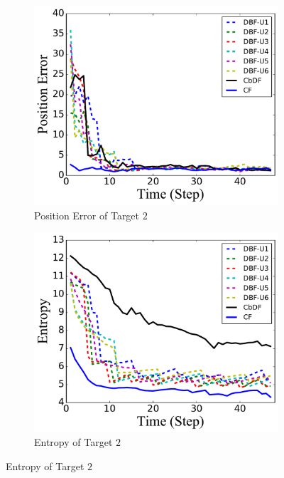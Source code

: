 \begin{figure}
\begin{subfigure}[b]{0.23\textwidth}
		\end{subfigure}	
		\begin{subfigure}[b]{0.23\textwidth}
			\includegraphics[width=\textwidth]{figures/hetero_mov_sen_mov_tar_pos_err_noise_circle}
			\caption{Position Error of Target $2$}\label{fig:cir_pos_err}
		\end{subfigure}
		\begin{subfigure}[b]{0.23\textwidth}
			\includegraphics[width=\textwidth]{figures/hetero_mov_sen_mov_tar_entropy_noise_circle}
			\caption{Entropy of Target $2$}\label{fig:cir_ent}
		\end{subfigure}			

\end{figure}

